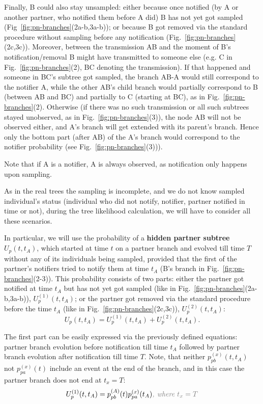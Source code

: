 \documentclass[a4paper,10pt]{article}
\begin{document}
Finally, B could also stay unsampled: either because once notified (by A or another partner, who notified them before A did) B has not yet got sampled (Fig~\ref{fig:pn-branches}(2a-b,3a-b)); or because B got removed via the standard procedure without sampling before any notification (Fig.~\ref{fig:pn-branches}(2c,3c)). Moreover, between the transmission AB and the moment of B's notification/removal B might have transmitted to someone else (e.g. C in Fig.~\ref{fig:pn-branches}(2), BC denoting the transmission). If that happened and someone in BC's subtree got sampled, the branch AB-A would still correspond to the notifier A, while the other AB's child branch would partially correspond to B (between AB and BC) and partially to C (starting at BC), as in Fig.~\ref{fig:pn-branches}(2). Otherwise (if there was no such transmission or all such subtrees stayed unobserved, as in Fig.~\ref{fig:pn-branches}(3)), the node AB will not be observed either, and A's branch will get extended with its parent's branch. Hence only the bottom part (after AB) of the A's branch would correspond to the notifier probability (see Fig.~\ref{fig:pn-branches}(3))).

Note that if A is a notifier, A is always observed, as notification only happens upon sampling.

As in the real trees the sampling is incomplete, and we do not know sampled individual's status (individual who did not notify, notifier, partner notified in time or not), during the tree likelihood calculation, we will have to consider all these scenarios.

In particular, we will use the probability of a \textbf{hidden partner subtree} $U_p(t, t_A)$, which started at time $t$ on a partner branch and evolved till time $T$ without any of its individuals being sampled, provided that the first of the partner's notifiers tried to notify them at time $t_A$ (B's branch in Fig.~\ref{fig:pn-branches}(2-3)). This probability consists of two parts: either the partner got notified at time $t_A$ but has not yet got sampled (like in Fig.~\ref{fig:pn-branches}(2a-b,3a-b)), $U_p^{(1)}(t, t_A)$;  or the partner got removed via the standard procedure before the time $t_A$ (like in Fig.~\ref{fig:pn-branches}(2c,3c)), $U_p^{(2)}(t, t_A)$: 
\begin{equation}
U_p(t, t_A) = U_p^{(1)}(t, t_A) + U_p^{(2)}(t, t_A).
\end{equation} 

The first part can be easily expressed via the previously defined equations: partner branch evolution before notification till time $t_A$ followed by partner branch evolution after notification till time $T$. Note, that neither  $p_{pb}^{(x)}(t, t_A)$ not $p_{pa}^{(x)}(t)$ include an event at the end of the branch, and in this case the partner branch does not end at $t_x = T$:
\begin{equation}
U_p^{(1)}(t, t_A) = p_{pb}^{(A)}(t) p_{pa}^{(x)}(t_A)\textit{\color{gray}, where $t_x =T$}
\end{equation} 
\end{document}
